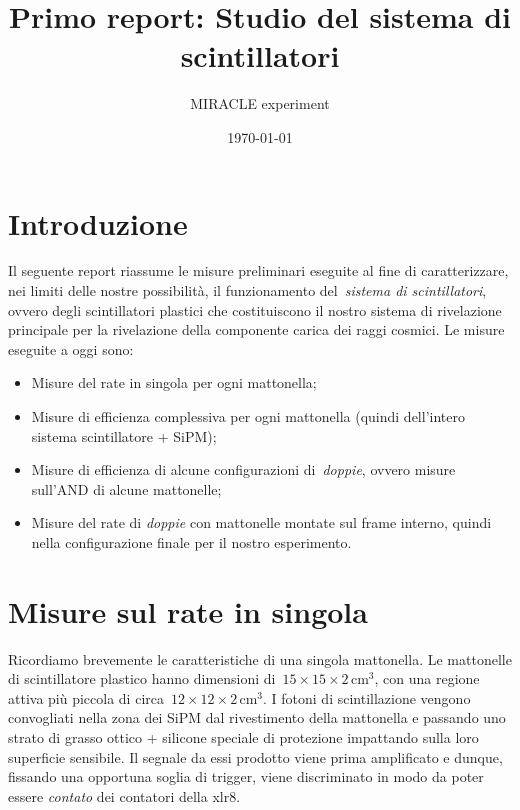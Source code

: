 \documentclass[11pt,a4paper]{article}
\title{Primo report: Studio del sistema di scintillatori}
\author{MIRACLE experiment}
\date{\today}
\begin{document}
    \maketitle

    \section{Introduzione}\label{sec:introduzione}

    Il seguente report riassume le misure preliminari eseguite al fine di caratterizzare, nei limiti delle nostre possibilità, il funzionamento del~\textit{sistema di scintillatori}, ovvero degli scintillatori plastici che costituiscono il nostro sistema di rivelazione principale per la rivelazione della componente carica dei raggi cosmici.
    Le misure eseguite a oggi sono:

    \begin{itemize}
        \item Misure del rate in singola per ogni mattonella;
        \item Misure di efficienza complessiva per ogni mattonella (quindi dell'intero sistema scintillatore + SiPM);
        \item Misure di efficienza di alcune configurazioni di~\textit{doppie}, ovvero misure sull'AND di alcune mattonelle;
        \item Misure del rate di \textit{doppie} con mattonelle montate sul frame interno, quindi nella configurazione finale per il nostro esperimento.
    \end{itemize}

    \section{Misure sul rate in singola}\label{sec:misure-sul-rate-in-singola}
    Ricordiamo brevemente le caratteristiche di una singola mattonella.
    Le mattonelle di scintillatore plastico hanno dimensioni di~$15\times15\times2\, \mathrm{cm^3}$, con una regione attiva più piccola di circa~$12\times12\times2\, \mathrm{cm^3}$.
    I fotoni di scintillazione vengono convogliati nella zona dei SiPM dal rivestimento della mattonella e passando uno strato di grasso ottico + silicone speciale di protezione impattando sulla loro superficie sensibile.
    Il segnale da essi prodotto viene prima amplificato e dunque, fissando una opportuna soglia di trigger, viene discriminato in modo da poter essere \textit{contato} dei contatori della xlr8.
\end{document}
